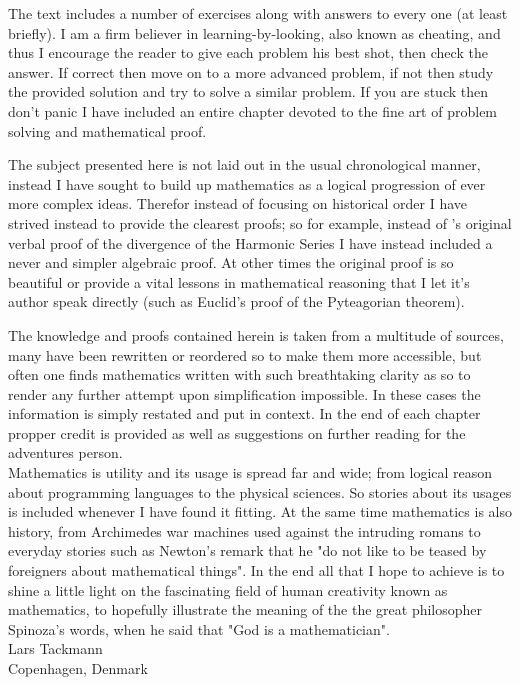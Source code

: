 The text includes a number of exercises along with answers to every one (at least briefly). I am a firm believer in learning-by-looking, also known as cheating, and thus I encourage the reader to give each problem his best shot, then check the answer. If correct then move on to a more advanced problem, if not then study the provided solution and try to solve a similar problem. If you are stuck then don't panic I have included an entire chapter devoted to the fine art of problem solving and mathematical proof.

The subject presented here is not laid out in the usual chronological manner, instead I have sought to build up mathematics as a logical progression of ever more complex ideas. Therefor instead of focusing on historical order I have strived instead to provide the clearest proofs; so for example, instead of 's original verbal proof of the divergence of the Harmonic Series I have instead included a never and simpler algebraic proof. At other times the original proof is so beautiful or provide a vital lessons in mathematical reasoning that I let it's author speak directly (such as Euclid's proof of the Pyteagorian theorem).

The knowledge and proofs contained herein is taken from a multitude of sources, many have been rewritten or reordered so to make them more accessible, but often one finds mathematics written with such breathtaking clarity as so to render any further attempt upon simplification impossible. In these cases the information is simply restated and put in context. In the end of each chapter propper credit is provided as well as suggestions on further reading for the adventures person.\\

\indent Mathematics is utility and its usage is spread far and wide; from logical reason about programming languages to the physical sciences. So stories about its usages is included whenever I have found it fitting. At the same time mathematics is also history, from Archimedes war machines used against the intruding romans to everyday stories such as Newton's remark that he "do not like to be teased by foreigners about mathematical things". In the end all that I hope to achieve is to shine a little light on the fascinating field of human creativity known as mathematics, to hopefully illustrate the meaning of the the great philosopher Spinoza's words, when he said that "God is a mathematician". \\
\flushright Lars Tackmann \\ Copenhagen, Denmark\flushleft


